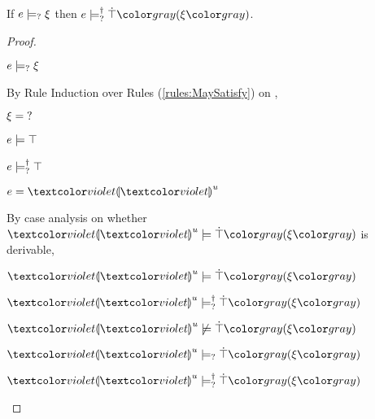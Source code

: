 \begin{lem}
  \label{lem:maysat-satormay-truify}
  If $e \models_{?} \xi$ then $\csatisfyormay{e}{\ctruify{\xi}}$.
\end{lem}
\begin{proof}
  \begin{pfsteps*}
  \item $e \models_{?} \xi$  
  \end{pfsteps*}
  By Rule Induction over Rules (\ref{rules:MaySatisfy}) on ,
  \begin{byCases}
  \item[\text{(\ref{rule:CMSUnknown})}]
      \begin{pfsteps*}
      \item $\xi = \mathtt{?}$ 
      \item $e \models \top$  
      \item $e \models_{?}^{\dag} \top$  
      \end{pfsteps*}
      
  \item[\text{(\ref{rule:CMSExpEHole})}]
    \begin{pfsteps*}
    \item $e = \hehole{u}$  
    \end{pfsteps*}
    By case analysis on whether $\csatisfy{\hehole{u}}{\ctruify{\xi}}$ is derivable,
    \begin{byCases}
    \item[\text{$\csatisfy{\hehole{u}}{\ctruify{\xi}}$ is derivable}]
      \begin{pfsteps*}
      \item $\csatisfy{\hehole{u}}{\ctruify{\xi}}$  
      \item $\csatisfyormay{\hehole{u}}{\ctruify{\xi}}$ 
      \end{pfsteps*}
    \item[\text{$\csatisfy{\hehole{u}}{\ctruify{\xi}}$ is not derivable}]
      \begin{pfsteps*}
      \item $\cnotsatisfy{\hehole{u}}{\ctruify{\xi}}$  
      \item $\cmaysatisfy{\hehole{u}}{\ctruify{\xi}}$  
      \item $\csatisfyormay{\hehole{u}}{\ctruify{\xi}}$ 
      \end{pfsteps*}
    \end{byCases}


\end{byCases}
\end{proof}
